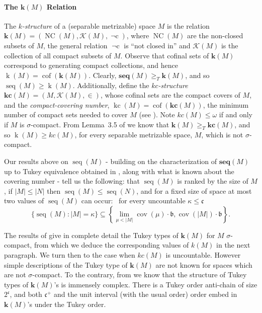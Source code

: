 \documentclass{article}
\newcommand{\tq}{\ge_T}
\newcommand{\K}{\mathcal{K}}
\DeclareMathOperator{\nci}{\neg c}
\DeclareMathOperator{\cof}{cof}
\begin{document}
\paragraph{The $\mathbf{k}(M)$ Relation}
The \emph{$k$-structure} of a (separable metrizable) space $M$ is the relation $\mathbf{k}(M)=(\mathop{NC}(M),\K(M),\nci)$, where $\mathop{NC}(M)$  are the non-closed subsets of $M$, the general relation $\nci$ is ``not closed in'' and $\K(M)$ is the collection of all compact subsets of $M$.  
Observe  that cofinal sets of $\mathbf{k}(M)$ correspond to generating compact collections, and hence $\mathop{k}(M)=\cof(\mathbf{k}(M))$. Clearly, $\mathbf{seq}(M) \tq \mathbf{k}(M)$, and so $\mathop{seq}(M) \ge \mathop{k}(M)$. 
Additionally, define the \emph{$kc$-structure}  $\mathbf{kc}(M)=(M,\K(M),\in)$, whose  cofinal sets are the compact covers of $M$,  and the \emph{compact-covering number}, $\mathop{kc}(M)=\cof(\mathbf{kc}(M))$, the minimum number of compact sets needed to cover $M$ (see \cite{FG_Shape_CC}). Note $kc(M)\le \omega$ if and only if $M$ is $\sigma$-compact.
From Lemma~3.5 of \cite{FG_Shape} we know that $\mathbf{k}(M) \tq \mathbf{kc}(M)$, and so $\mathop{k}(M) \ge kc(M)$, for every separable metrizable space, $M$, which is not $\sigma$-compact. 

Our results above on $\mathop{seq}(M)$ -  building on the characterization of $\mathbf{seq}(M)$ up to Tukey equivalence obtained in \cite{FG_Shape}, along with what is known about the covering number - tell us the following: that $\mathop{seq}(M)$ is ranked by the size of $M$, if $|M|\le|N|$ then $\mathop{seq}(M)\le\mathop{seq}(N)$, and for a fixed size of space at most two values of $\mathop{seq}(M)$ can occur:  \ for every uncountable $\kappa \le \mathfrak{c}$
\[ \{\mathop{seq}(M) : |M|=\kappa\} \subseteq \left\{\lim_{\mu <|M|} \mathop{cov}(\mu) \cdot\mathfrak{b},\mathop{cov}(|M|)\cdot\mathfrak{b}\right\}.\] 



The results of \cite{FG_Shape} give in complete detail the Tukey types of $\mathbf{k}(M)$ for $M$ $\sigma$-compact, from which we deduce the corresponding values of $k(M)$ in the next paragraph. We turn then to the case when $kc(M)$ is uncountable. 
However simple descriptions of the Tukey type of $\mathbf{k}(M)$ are not known for spaces which are not $\sigma$-compact. To the contrary, from \cite{FG_Shape} we know that the structure of Tukey types of $\mathbf{k}(M)$'s is immensely complex. There is a Tukey order anti-chain of size $2^\mathfrak{c}$, and both $\mathfrak{c}^+$ and the unit interval (with the usual order) order embed in $\mathbf{k}(M)$'s under the Tukey order.
\end{document}
